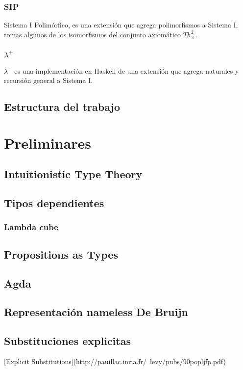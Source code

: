 \documentclass[]{report}
\begin{document}
	
	\subsection{SIP}
	Sistema I Polimórfico, es una extensión que agrega polimorfismos a Sistema I, tomas algunos de los isomorfismos del conjunto axiomático $Th^2_\times$.

	\subsection{$\lambda^+$}
	$\lambda^+$ \cite{lambda-plus} es una implementación en Haskell de una extensión que agrega naturales y recursión general a Sistema I.
	
	
	\section{Estructura del trabajo}
	
	\chapter{Preliminares}
	
	\section{Intuitionistic Type Theory}
	\section{Tipos dependientes}
	\subsection{Lambda cube}
	\section{Propositions as Types}
	\section{Agda}
	\section{Representación nameless De Bruijn}
	\section{Substituciones explicitas}
	[Explicit Substitutions](http://pauillac.inria.fr/~levy/pubs/90popljfp.pdf)
	
\end{document}
